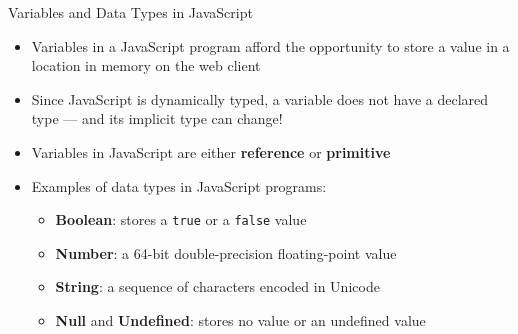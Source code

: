 \documentclass[14pt,aspectratio=169]{beamer}
\begin{document}
%
\begin{frame}{Variables and Data Types in JavaScript}
  \begin{itemize}
      \item Variables in a JavaScript program afford the opportunity to store a
      value in a location in memory on the web client
      \vspace*{-.2in}
    \item Since JavaScript is dynamically typed, a variable does not have a
      declared type --- and its implicit type can change!
      \vspace*{-.2in}
    \item Variables in JavaScript are either {\bf reference} or {\bf primitive}
      \vspace*{-.2in}
    \item Examples of data types in JavaScript programs:
      \begin{itemize}
        \item {\bf Boolean}: stores a {\tt true} or a {\tt false} value
        \item {\bf Number}: a 64-bit double-precision floating-point value
        \item {\bf String}: a sequence of characters encoded in Unicode
        \item {\bf Null} and {\bf Undefined}: stores no value or an undefined value
      \end{itemize}
      \vspace*{-.2in}
  \end{itemize}
\end{frame}
\end{document}
